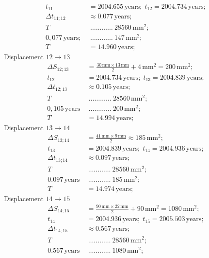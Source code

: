 \begin{description}
\begin{align*}
    t_{11} &= 2004.655\,\mathrm{years};\; t_{12} = 2004.734\,\mathrm{years};\\
    \Delta t_{11;12} &\approx 0.077\,\mathrm{years};\\
    T\ &\ \dots\dots\dots\dots\ 28560\,\mathrm{mm}^2;\\
    0{,}077\,\mathrm{years};\ &\ \dots\dots\dots\dots\ 147\,\mathrm{mm}^2;\\
    T &= 14.960\,\mathrm{years};
  \end{align*}
  Displacement $12 \rightarrow 13$
  \begin{align*}
    \Delta S_{12;13} &= \frac{30\,\mathrm{mm}\times13\,\mathrm{mm}}{2}
      + 4\,\mathrm{mm}^2 = 200\,\mathrm{mm}^2;\\
    t_{12} &= 2004.734\,\mathrm{years};\; t_{13} = 2004.839\,\mathrm{years};\\
    \Delta t_{12;13} &\approx 0.105\,\mathrm{years};\\
    T\ &\ \dots\dots\dots\dots\ 28560\,\mathrm{mm}^2;\\
    0{,}105\,\mathrm{years}\ &\ \dots\dots\dots\dots\ 200\,\mathrm{mm}^2;\\
    T &= 14.994\,\mathrm{years};
  \end{align*}
  Displacement $13 \rightarrow 14$
  \begin{align*}
    \Delta S_{13;14} &= \frac{41\,\mathrm{mm}\times9\,\mathrm{mm}}{2}
      \approx 185\,\mathrm{mm}^2;\\
    t_{13} &= 2004.839\,\mathrm{years};\; t_{14} = 2004.936\,\mathrm{years};\\
    \Delta t_{13;14} &\approx 0.097\,\mathrm{years};\\
    T\ &\ \dots\dots\dots\dots\ 28560\,\mathrm{mm}^2;\\
    0.097\,\mathrm{years}\ &\ \dots\dots\dots\dots\ 185\,\mathrm{mm}^2;\\
    T &= 14.974\,\mathrm{years};
  \end{align*}
  Displacement $14 \rightarrow 15$
  \begin{align*}
    \Delta S_{14;15} &= \frac{90\,\mathrm{mm}\times22\,\mathrm{mm}}{2}
      + 90\,\mathrm{mm}^2 = 1080\,\mathrm{mm}^2;\\
    t_{14} &= 2004.936\,\mathrm{years};\; t_{15} = 2005.503\,\mathrm{years};\\
    \Delta t_{14;15} &\approx 0.567\,\mathrm{years};\\
    T\ &\ \dots\dots\dots\dots\ 28560\,\mathrm{mm}^2;\\
    0.567\,\mathrm{years}\ &\ \dots\dots\dots\dots\ 1080\,\mathrm{mm}^2;\\

\end{align*}
\end{description}
